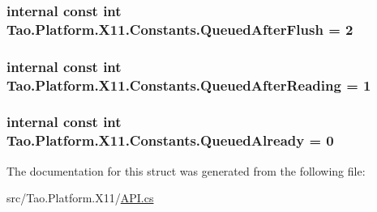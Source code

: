 \label{struct_tao_1_1_platform_1_1_x11_1_1_constants_a6f3227d40d1193df46290e2551acf852}
\hypertarget{struct_tao_1_1_platform_1_1_x11_1_1_constants_a8060ac838e44e2bc58951eb322f7c7c3}{
\subsubsection[{QueuedAfterFlush}]{\setlength{\rightskip}{0pt plus 5cm}internal const int {\bf Tao.Platform.X11.Constants.QueuedAfterFlush} = 2}}
\label{struct_tao_1_1_platform_1_1_x11_1_1_constants_a8060ac838e44e2bc58951eb322f7c7c3}
\hypertarget{struct_tao_1_1_platform_1_1_x11_1_1_constants_a78d7be835b5c5604b45393ce44e710b5}{
\subsubsection[{QueuedAfterReading}]{\setlength{\rightskip}{0pt plus 5cm}internal const int {\bf Tao.Platform.X11.Constants.QueuedAfterReading} = 1}}
\label{struct_tao_1_1_platform_1_1_x11_1_1_constants_a78d7be835b5c5604b45393ce44e710b5}
\hypertarget{struct_tao_1_1_platform_1_1_x11_1_1_constants_a9646aa421036b0bf4e623c4ce091131f}{
\subsubsection[{QueuedAlready}]{\setlength{\rightskip}{0pt plus 5cm}internal const int {\bf Tao.Platform.X11.Constants.QueuedAlready} = 0}}
\label{struct_tao_1_1_platform_1_1_x11_1_1_constants_a9646aa421036b0bf4e623c4ce091131f}


The documentation for this struct was generated from the following file:\begin{DoxyCompactItemize}
\item 
src/Tao.Platform.X11/\hyperlink{_a_p_i_8cs}{API.cs}\end{DoxyCompactItemize}
